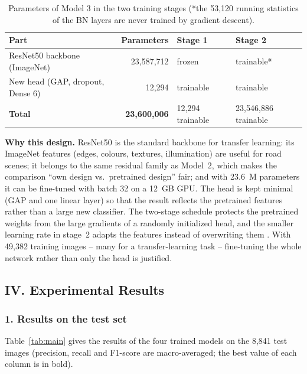 \documentclass[12pt,letterpaper]{article}
\begin{document}
\begin{table}[htbp]
\centering\small
\caption{Parameters of Model 3 in the two training stages (*the 53{,}120 running statistics of the BN layers are never
trained by gradient descent).}
\label{tab:resnet}
\begin{tabular}{lrll}
\toprule
Part & Parameters & Stage 1 & Stage 2 \\
\midrule
ResNet50 backbone (ImageNet)      & 23{,}587{,}712 & frozen    & trainable* \\
New head (GAP, dropout, Dense 6)  & 12{,}294       & trainable & trainable \\
\midrule
\textbf{Total}                    & \textbf{23{,}600{,}006} & 12{,}294 trainable & 23{,}546{,}886 trainable \\
\bottomrule
\end{tabular}
\end{table}

\textbf{Why this design.} ResNet50 is the standard backbone for transfer learning: its ImageNet features (edges,
colours, textures, illumination) are useful for road scenes; it belongs to the same residual family as Model~2, which
makes the comparison ``own design vs.\ pretrained design'' fair; and with 23.6~M parameters it can be fine-tuned with
batch 32 on a 12~GB GPU. The head is kept minimal (GAP and one linear layer) so that the result reflects the pretrained
features rather than a large new classifier. The two-stage schedule protects the pretrained weights from the large
gradients of a randomly initialized head, and the smaller learning rate in stage~2 adapts the features instead of
overwriting them \cite{yosinski2014}. With 49{,}382 training images -- many for a transfer-learning task -- fine-tuning
the whole network rather than only the head is justified.

\FloatBarrier
\subsection{IV. Experimental Results}

\subsubsection{1. Results on the test set}
Table~\ref{tab:main} gives the results of the four trained models on the 8{,}841 test images (precision, recall and
F1-score are macro-averaged; the best value of each column is in bold).
\end{document}
